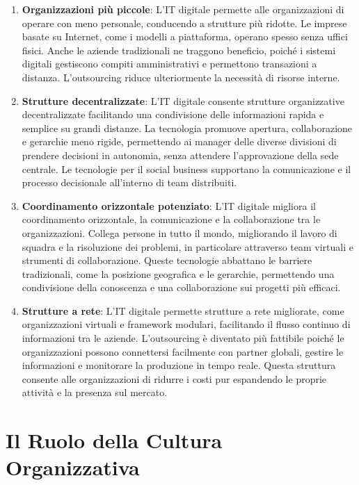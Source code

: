 \documentclass{article}
\begin{document}
\begin{enumerate}
  \item \textbf{Organizzazioni più piccole}: L'IT digitale permette alle organizzazioni di operare con meno personale, conducendo a strutture più ridotte. Le imprese basate su Internet, come i modelli a piattaforma, operano spesso senza uffici fisici. Anche le aziende tradizionali ne traggono beneficio, poiché i sistemi digitali gestiscono compiti amministrativi e permettono transazioni a distanza. L'outsourcing riduce ulteriormente la necessità di risorse interne.
  
  \item \textbf{Strutture decentralizzate}: L'IT digitale consente strutture organizzative decentralizzate facilitando una condivisione delle informazioni rapida e semplice su grandi distanze. La tecnologia promuove apertura, collaborazione e gerarchie meno rigide, permettendo ai manager delle diverse divisioni di prendere decisioni in autonomia, senza attendere l'approvazione della sede centrale. Le tecnologie per il social business supportano la comunicazione e il processo decisionale all'interno di team distribuiti.
  
  \item \textbf{Coordinamento orizzontale potenziato}: L'IT digitale migliora il coordinamento orizzontale, la comunicazione e la collaborazione tra le organizzazioni. Collega persone in tutto il mondo, migliorando il lavoro di squadra e la risoluzione dei problemi, in particolare attraverso team virtuali e strumenti di collaborazione. Queste tecnologie abbattano le barriere tradizionali, come la posizione geografica e le gerarchie, permettendo una condivisione della conoscenza e una collaborazione sui progetti più efficaci.
  
  \item \textbf{Strutture a rete}: L'IT digitale permette strutture a rete migliorate, come organizzazioni virtuali e framework modulari, facilitando il flusso continuo di informazioni tra le aziende. L'outsourcing è diventato più fattibile poiché le organizzazioni possono connettersi facilmente con partner globali, gestire le informazioni e monitorare la produzione in tempo reale. Questa struttura consente alle organizzazioni di ridurre i costi pur espandendo le proprie attività e la presenza sul mercato.
\end{enumerate}


\section{Il Ruolo della Cultura Organizzativa}
\end{document}
